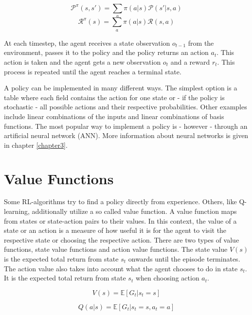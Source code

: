 \begin{equation}
\mathcal{P}^\pi(s,s')=\sum_a \pi(a|s)\mathcal{P}(s'|s,a)
\label{eq:transprobpi}
\end{equation}
\begin{equation}
\mathcal{R}^\pi(s) = \sum_a\pi(a|s)\mathcal{R}(s,a)
\label{eq:rewardpi}
\end{equation}

At each timestep, the agent receives a state observation $o_{t-1}$ from the environment, passes it to the policy and the policy returns an action $a_t$. This action is taken and the agent gets a new observation $o_t$ and a reward $r_t$. This process is repeated until the agent reaches a terminal state.

A policy can be implemented in many different ways. The simplest option is a table where each field contains the action for one state or - if the policy is stochastic - all possible actions and their respective probabilities. Other examples include linear combinations of the inputs and linear combinations of basis functions. The most popular way to implement a policy is - however - through an artificial neural network (ANN). More information about neural networks is given in chapter \ref{chapter3}.  

\section{Value Functions}
\label{sec:value-function}

Some RL-algorithms try to find a policy directly from experience. Others, like Q-learning, additionally utilize a so called value function. A value function maps from states or state-action pairs to their values. In this context, the value of a state or an action is a measure of how useful it is for the agent to visit the respective state or choosing the respective action. There are two types of value functions, state value functions and action value functions. The state value $V(s)$ is the expected total return from state $s_t$ onwards until the episode terminates. The action value also takes into account what the agent chooses to do in state $s_t$. It is the expected total return from state $s_t$ when choosing action $a_t$.

\begin{equation}
V(s) = \mathbb{E}[G_t|s_t=s]
\label{eq:state_value_fun}
\end{equation}

\begin{equation}
Q(a|s) = \mathbb{E}[G_t|s_t=s,a_t=a]
\label{eq:action_value_fun}
\end{equation}


